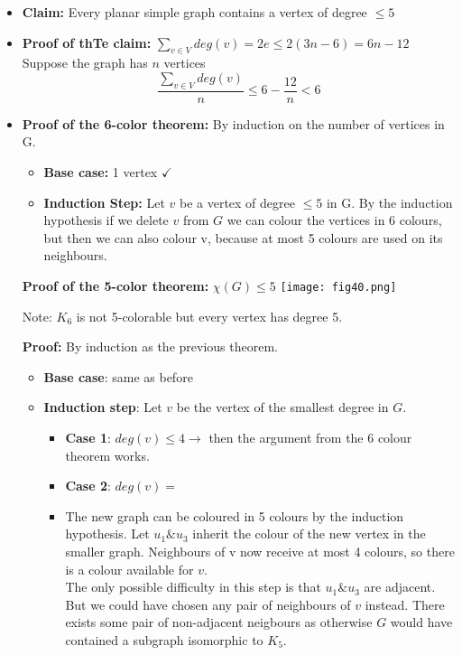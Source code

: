 \documentclass[9pt, letterpaper, oneside]{article}
\begin{document}
\begin{itemize}
\item \textbf{Claim:} Every planar simple graph contains a vertex of degree $\leq 5$
\item \textbf{Proof of thTe claim:} $\sum_{v \in V} deg(v) = 2e \leq 2(3n-6) = 6n -12$\\
Suppose the graph has $n$ vertices\\
$$\displaystyle \frac{\sum_{v \in V} deg(v)}{n} \leq 6 - \frac{12}{n} < 6$$
\item \textbf{Proof of the 6-color theorem:}
By induction on the number of vertices in G. 
\begin{itemize}
\item \textbf{Base case:} 1 vertex $\checkmark$
\item \textbf{Induction Step:} Let $v$ be a vertex of degree $\leq 5$ in G. By the induction hypothesis if we delete $v$ from $G$ we can colour the vertices in 6 colours, but then we can also colour v, because at most 5 colours are used on its neighbours.
\end{itemize}

\textbf{Proof of the 5-color theorem:} $\chi(G) \leq 5$
\texttt{[image: fig40.png]}

Note: $K_6$ is not 5-colorable but every vertex has degree 5.

\textbf{Proof:} By induction as the previous theorem.

\begin{itemize}
\item \textbf{Base case}: same as before
\item \textbf{Induction step}: Let $v$ be the vertex of the smallest degree in $G$.
    \begin{itemize}
    \item \textbf{Case 1}: $deg(v) \leq 4 \to$ then the argument from the 6 colour theorem works.
    \item \textbf{Case 2}: $deg(v) = $%
    \item The new graph can be coloured in 5 colours by the induction hypothesis. Let $u_1 \& u_3$ inherit the colour of the new vertex in the smaller graph. Neighbours of v now receive at most 4 colours, so there is a colour available for $v$.\\
    The only possible difficulty in this step is that $u_1 \& u_3$ are adjacent. But we could have chosen any pair of neighbours of $v$ instead. There exists some pair of non-adjacent neigbours as otherwise $G$ would have contained a subgraph isomorphic to $K_5$.
    \end{itemize}
\end{itemize}
\end{itemize}
\end{document}
